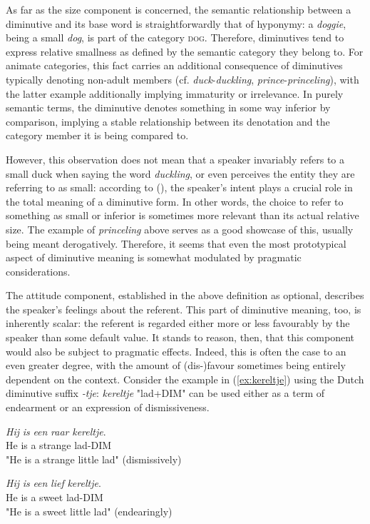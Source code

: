 As far as the size component is concerned, the semantic relationship between a diminutive and its base word is straightforwardly that of hyponymy: a \textit{doggie}, being a small \textit{dog}, is part of the category \textsc{dog}. Therefore, diminutives tend to express relative smallness as defined by the semantic category they belong to. For animate categories, this fact carries an additional consequence of diminutives typically denoting non-adult members (cf. \textit{duck}-\textit{duckling}, \textit{prince}-\textit{princeling}), with the latter example additionally implying immaturity or irrelevance. In purely semantic terms, the diminutive denotes something in some way inferior by comparison, implying a stable relationship between its denotation and the category member it is being compared to.

However, this observation does not mean that a speaker invariably refers to a small duck when saying the word \textit{duckling}, or even perceives the entity they are referring to as small: according to \citeauthor{Schneider+2003} (\citeyear{Schneider+2003}), the speaker's intent plays a crucial role in the total meaning of a diminutive form. In other words, the choice to refer to something as small or inferior is sometimes more relevant than its actual relative size. The example of \textit{princeling} above serves as a good showcase of this, usually being meant derogatively. Therefore, it seems that even the most prototypical aspect of diminutive meaning is somewhat modulated by pragmatic considerations.

The attitude component, established in the above definition as optional, describes the speaker's feelings about the referent. This part of diminutive meaning, too, is inherently scalar: the referent is regarded either more or less favourably by the speaker than some default value. It stands to reason, then, that this component would also be subject to pragmatic effects. Indeed, this is often the case to an even greater degree, with the amount of (dis-)favour sometimes being entirely dependent on the context. Consider the example in (\ref{ex:kereltje}) using the Dutch diminutive suffix \textit{-tje}: \textit{kereltje} "lad+DIM" can be used either as a term of endearment or an expression of dismissiveness.

\begin{exe}
\ex \label{ex:kereltje} 
\begin{xlist}
\ex \gll
\textit{Hij} \textit{is} \textit{een} \textit{raar} \textit{kereltje}.\\
He	is	a  strange	lad-DIM\\
\trans "He is a strange little lad" (dismissively)

\ex \gll
\textit{Hij} \textit{is} \textit{een} \textit{lief} \textit{kereltje}.\\
He	is	a  sweet	lad-DIM\\
\trans "He is a sweet little lad" (endearingly)
\end{xlist}
\end{exe}

